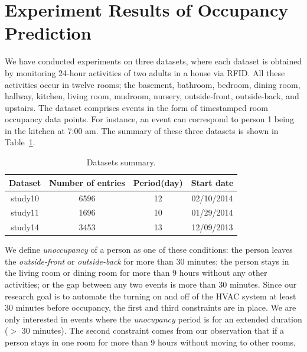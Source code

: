 \section{Experiment Results of Occupancy Prediction}
We have conducted experiments on three datasets, where each dataset is obtained by monitoring 24-hour activities of two adults in a house via RFID. 
All these activities occur in twelve rooms; the basement, bathroom, bedroom, dining room, hallway, kitchen, living room, mudroom, nursery, outside-front, outside-back, and upstairs. 
The dataset comprises events in the form of timestamped room occupancy data points. For instance, an event can correspond to person 1 being in the kitchen at 7:00 am. The summary of these three datasets is shown in Table~\ref{tab_dataset}. 
\begin{table}[h]
\centering
\caption {Datasets summary.} \label{tab_dataset}
\begin{tabular} {|c|c|c|c|}
\hline
Dataset & Number of entries & Period(day) & Start date\\
\hline
study10  & 6596 & 12 & 02/10/2014\\
\hline
study11  & 1696 & 10 & 01/29/2014\\
\hline
study14 & 3453 & 13 & 12/09/2013\\
\hline
\end{tabular}
\end{table}
We define \textit{unoccupancy} of a person as one of these conditions: the person leaves the {\em outside-front} or {\em outside-back} for more than 30 minutes; the person stays in the living room or dining room for more than 9 hours without any other activities; or the gap between any two events is more than 30 minutes. 
Since our research goal is to automate the turning on and off of the HVAC system at least 30 minutes before occupancy, the first and third constraints are in place. We are only interested in events where the {\em unocupancy} period is for an extended duration ($>$ 30 minutes). The second constraint comes from our observation that if a person stays in one room for more than 9 hours without moving to other rooms, 
